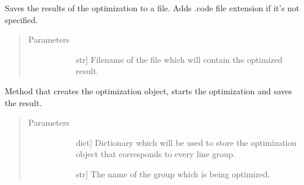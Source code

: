 \documentclass[letterpaper,10pt,english,openany,oneside]{sphinxmanual}
\begin{document}
\begin{fulllineitems}
\begin{fulllineitems}
\end{fulllineitems}


\begin{fulllineitems}
\label{\detokenize{reference:cnc.optimization.CNCOptimizer.save}}
Saves the results of the optimization to a file. Adds .code file
extension if it’s not specified.
\begin{quote}\begin{description}
\item[{Parameters}] \leavevmode\begin{description}
\item[{}] \leavevmode{[}str{]}
Filename of the file which will contain the optimized result.

\end{description}

\end{description}\end{quote}

\end{fulllineitems}


\begin{fulllineitems}
\label{\detokenize{reference:cnc.optimization.CNCOptimizer.start_process}}
Method that creates the optimization object, starts the optimization
and saves the result.
\begin{quote}\begin{description}
\item[{Parameters}] \leavevmode\begin{description}
\item[{}] \leavevmode{[}dict{]}
Dictionary which will be used to store the optimization object that
corresponds to every line group.

\item[{}] \leavevmode{[}str{]}
The name of the group which is being optimized.


\end{description}
\end{description}
\end{quote}
\end{fulllineitems}
\end{fulllineitems}
\end{document}
